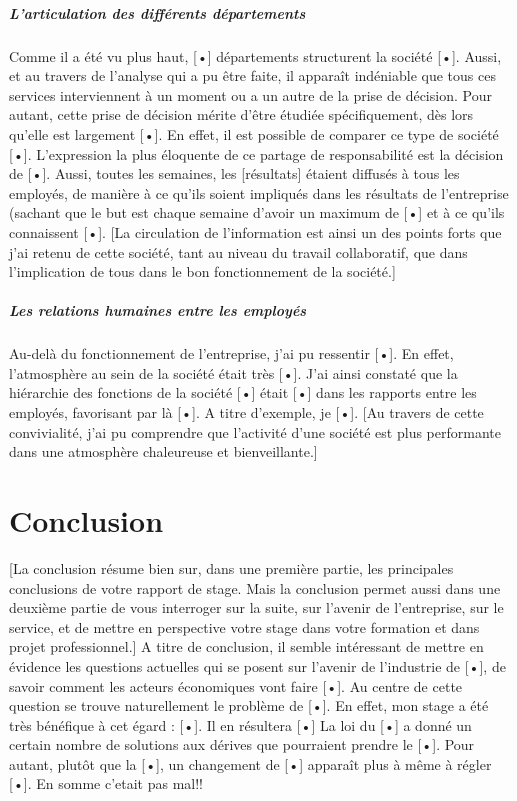 \documentclass{article}
\begin{document}
			\subsubsection{L’articulation des différents départements}
				Comme il a été vu plus haut, [•] départements structurent la société [•]. Aussi, et au travers de l’analyse 
				qui a pu être faite, il apparaît indéniable que tous ces services interviennent à un moment ou a un autre de 
				la prise de décision. Pour autant, cette prise de décision mérite d’être étudiée spécifiquement, dès lors 
				qu’elle est largement [•]. En effet, il est possible de comparer ce type de société [•].
				L’expression la plus éloquente de ce partage de responsabilité est la décision de [•].
				Aussi, toutes les semaines, les [résultats]  étaient diffusés à tous les employés, de manière à ce qu’ils 
				soient impliqués dans les résultats de l’entreprise (sachant que le but est chaque semaine d’avoir un maximum 
				de [•] et à ce qu’ils connaissent [•].
				[La circulation de l’information est ainsi un des points forts que j’ai retenu de cette société, tant au 
				niveau du travail collaboratif, que dans l’implication de tous dans le bon fonctionnement de la société.]
			\subsubsection{Les relations humaines entre les employés}
				Au-delà du fonctionnement de l’entreprise, j’ai pu ressentir [•].
				En effet, l’atmosphère au sein de la société était très [•]. J’ai ainsi constaté que la hiérarchie des 
				fonctions de la société [•] était [•] dans les rapports entre les employés, favorisant par là [•].
				A titre d’exemple, je [•].
				[Au travers de cette convivialité, j’ai pu comprendre que l’activité d’une société est plus performante 
				dans une atmosphère chaleureuse et bienveillante.]
\newpage
{}
\part{Conclusion}
	[La conclusion résume bien sur, dans une première partie, les principales conclusions de votre rapport de stage. Mais la 
	conclusion permet aussi dans une deuxième partie de vous interroger sur la suite, sur l’avenir de l’entreprise, sur le 
	service, et de mettre en perspective votre stage dans votre formation et dans projet professionnel.]
	A titre de conclusion, il semble intéressant de mettre en évidence les questions actuelles qui se posent sur l’avenir de 
	l’industrie de [•], de savoir comment les acteurs économiques vont faire [•]. Au centre de cette question se trouve 
	naturellement le problème de [•]. En effet, mon stage a été très bénéfique à cet égard : [•]. Il en résultera [•]
	La loi du [•] a donné un certain nombre de solutions aux dérives que pourraient prendre le [•]. Pour autant, plutôt 
	que la [•], un changement de [•] apparaît plus à même à régler [•].
	En somme c'etait pas mal!!
\end{document}
